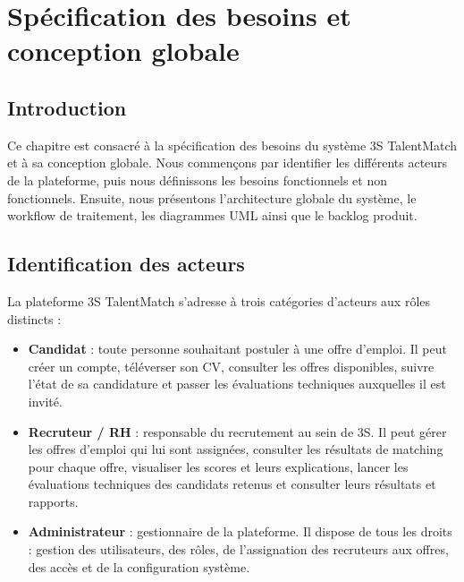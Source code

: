 \documentclass[12pt,a4paper]{report}
\begin{document}
\newpage

\chapter{Spécification des besoins et conception globale}

\section{Introduction}

Ce chapitre est consacré à la spécification des besoins du système 3S TalentMatch et à sa conception globale. Nous commençons par identifier les différents acteurs de la plateforme, puis nous définissons les besoins fonctionnels et non fonctionnels. Ensuite, nous présentons l'architecture globale du système, le workflow de traitement, les diagrammes UML ainsi que le backlog produit.

\section{Identification des acteurs}

La plateforme 3S TalentMatch s'adresse à trois catégories d'acteurs aux rôles distincts :

\begin{itemize}
  \item \textbf{Candidat} : toute personne souhaitant postuler à une offre d'emploi. Il peut créer un compte, téléverser son CV, consulter les offres disponibles, suivre l'état de sa candidature et passer les évaluations techniques auxquelles il est invité.
  \item \textbf{Recruteur / RH} : responsable du recrutement au sein de 3S. Il peut gérer les offres d'emploi qui lui sont assignées, consulter les résultats de matching pour chaque offre, visualiser les scores et leurs explications, lancer les évaluations techniques des candidats retenus et consulter leurs résultats et rapports.
  \item \textbf{Administrateur} : gestionnaire de la plateforme. Il dispose de tous les droits : gestion des utilisateurs, des rôles, de l'assignation des recruteurs aux offres, des accès et de la configuration système.
\end{itemize}
\end{document}
